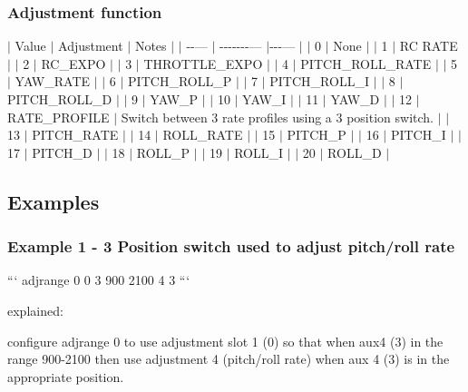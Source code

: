 \subsubsection*{Adjustment function}

$\vert$ Value $\vert$ Adjustment $\vert$ Notes $\vert$ $\vert$ -\/-\/--- $\vert$ -\/-\/-\/-\/-\/-\/-\/--- $\vert$-\/-\/-\/--- $\vert$ $\vert$ 0 $\vert$ None $\vert$ $\vert$ 1 $\vert$ R\+C R\+A\+T\+E $\vert$ $\vert$ 2 $\vert$ R\+C\+\_\+\+E\+X\+P\+O $\vert$ $\vert$ 3 $\vert$ T\+H\+R\+O\+T\+T\+L\+E\+\_\+\+E\+X\+P\+O $\vert$ $\vert$ 4 $\vert$ P\+I\+T\+C\+H\+\_\+\+R\+O\+L\+L\+\_\+\+R\+A\+T\+E $\vert$ $\vert$ 5 $\vert$ Y\+A\+W\+\_\+\+R\+A\+T\+E $\vert$ $\vert$ 6 $\vert$ P\+I\+T\+C\+H\+\_\+\+R\+O\+L\+L\+\_\+\+P $\vert$ $\vert$ 7 $\vert$ P\+I\+T\+C\+H\+\_\+\+R\+O\+L\+L\+\_\+\+I $\vert$ $\vert$ 8 $\vert$ P\+I\+T\+C\+H\+\_\+\+R\+O\+L\+L\+\_\+\+D $\vert$ $\vert$ 9 $\vert$ Y\+A\+W\+\_\+\+P $\vert$ $\vert$ 10 $\vert$ Y\+A\+W\+\_\+\+I $\vert$ $\vert$ 11 $\vert$ Y\+A\+W\+\_\+\+D $\vert$ $\vert$ 12 $\vert$ R\+A\+T\+E\+\_\+\+P\+R\+O\+F\+I\+L\+E $\vert$ Switch between 3 rate profiles using a 3 position switch. $\vert$ $\vert$ 13 $\vert$ P\+I\+T\+C\+H\+\_\+\+R\+A\+T\+E $\vert$ $\vert$ 14 $\vert$ R\+O\+L\+L\+\_\+\+R\+A\+T\+E $\vert$ $\vert$ 15 $\vert$ P\+I\+T\+C\+H\+\_\+\+P $\vert$ $\vert$ 16 $\vert$ P\+I\+T\+C\+H\+\_\+\+I $\vert$ $\vert$ 17 $\vert$ P\+I\+T\+C\+H\+\_\+\+D $\vert$ $\vert$ 18 $\vert$ R\+O\+L\+L\+\_\+\+P $\vert$ $\vert$ 19 $\vert$ R\+O\+L\+L\+\_\+\+I $\vert$ $\vert$ 20 $\vert$ R\+O\+L\+L\+\_\+\+D $\vert$

\subsection*{Examples}

\subsubsection*{Example 1 -\/ 3 Position switch used to adjust pitch/roll rate}

``` adjrange 0 0 3 900 2100 4 3 ```

explained\+:


\begin{DoxyItemize}
\item configure adjrange 0 to use adjustment slot 1 (0) so that when aux4 (3) in the range 900-\/2100 then use adjustment 4 (pitch/roll rate) when aux 4 (3) is in the appropriate position.
\end{DoxyItemize}

